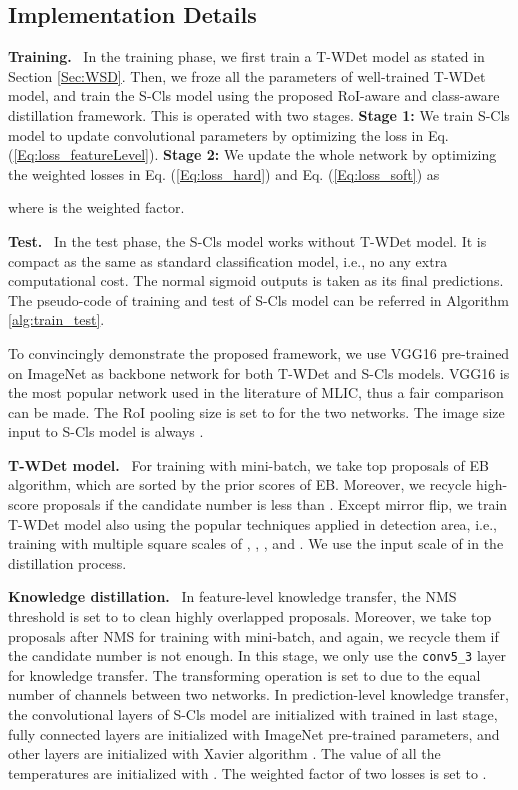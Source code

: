 \documentclass[sigconf,natbib=false]{acmart}
\begin{document}
\subsection{Implementation Details}
\noindent \textbf{Training.} \ In the training phase, we first train a T-WDet model as stated in Section \ref{Sec:WSD}. Then, we froze all the parameters of well-trained T-WDet model, and train the S-Cls model using the proposed RoI-aware and class-aware distillation framework. This is operated with two stages. \textbf{Stage 1:} We train S-Cls model to update convolutional parameters  by optimizing the loss in Eq. (\ref{Eq:loss_featureLevel}). \textbf{Stage 2:} We update the whole network by optimizing the weighted losses in Eq. (\ref{Eq:loss_hard}) and Eq. (\ref{Eq:loss_soft}) as

where  is the weighted factor.

\noindent \textbf{Test.} \ In the test phase, the S-Cls model works without T-WDet model. It is compact as the same as standard classification model, i.e., no any extra computational cost. The normal sigmoid outputs  is taken as its final predictions. The pseudo-code of training and test of S-Cls model can be referred in Algorithm \ref{alg:train_test}.

To convincingly demonstrate the proposed framework, we use VGG16 pre-trained on ImageNet as backbone network for both T-WDet and S-Cls models. VGG16 is the most popular network used in the literature of MLIC, thus a fair comparison can be made. The RoI pooling size is set to  for the two networks. The image size input to S-Cls model is always .

\noindent \textbf{T-WDet model.} \ For training with mini-batch, we take top  proposals of EB algorithm, which are sorted by the prior scores of EB. Moreover, we recycle high-score proposals if the candidate number is less than . Except mirror flip, we train T-WDet model also using the popular techniques applied in detection area, i.e., training with multiple square scales of , , ,  and . We use the input scale of  in the distillation process.

\noindent \textbf{Knowledge  distillation.} \ In feature-level knowledge transfer, the NMS threshold is set to  to clean highly overlapped proposals. Moreover, we take top  proposals after NMS for training with mini-batch, and again, we recycle them if the candidate number is not enough. In this stage, we only use the \texttt{conv5\_3} layer for knowledge transfer. The transforming operation is set to  due to the equal number of channels between two networks. In prediction-level knowledge transfer, the convolutional layers of S-Cls model are initialized with  trained in last stage, fully connected layers are initialized with ImageNet pre-trained parameters, and other layers are initialized with Xavier algorithm \cite{Xavier_jmlr10_gb}. The value of all the temperatures  are initialized with . The weighted factor  of two losses is set to .
\end{document}
